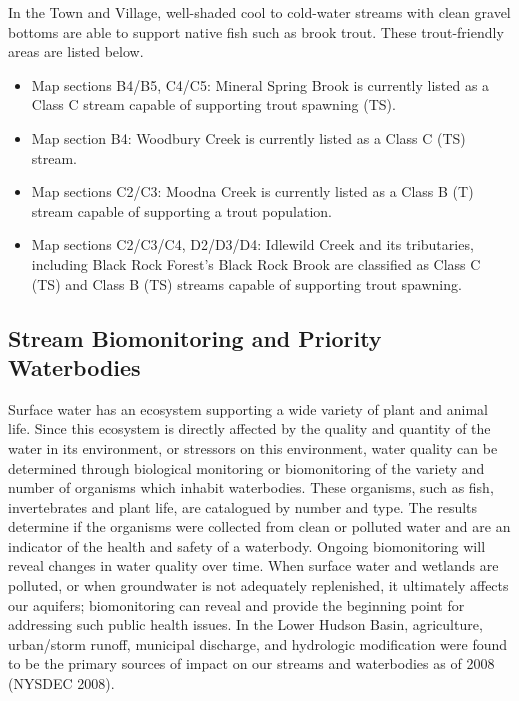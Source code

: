 In the Town and Village, well-shaded cool to cold-water streams with clean 
gravel bottoms are able to support native fish such as brook trout. These 
trout-friendly areas are listed below.
\begin{itemize}
    \item Map sections B4/B5, C4/C5: Mineral Spring Brook is currently listed 
as a Class C stream capable of supporting trout spawning (TS).
    \item Map section B4: Woodbury Creek is currently listed as a Class C (TS) 
stream.
    \item Map sections C2/C3: Moodna Creek is currently listed as a Class B (T) 
stream capable of supporting a trout population.
    \item Map sections C2/C3/C4, D2/D3/D4: Idlewild Creek and its tributaries, 
including Black Rock Forest’s Black Rock Brook are classified as Class C (TS) 
and Class B (TS) streams capable of supporting trout spawning.
\end{itemize}

\label{map:streamclassifications}

\subsection*{Stream Biomonitoring and Priority 
Waterbodies}\label{subsec:streambiomonitoring}
Surface water has an ecosystem supporting a wide variety of plant and animal 
life. Since this ecosystem is directly affected by the quality and quantity of 
the water in its environment, or stressors on this environment, water quality 
can be determined through biological monitoring or biomonitoring of the variety 
and number of organisms which inhabit waterbodies. These organisms, such as 
fish, invertebrates and plant life, are catalogued by number and type. The 
results determine if the organisms were collected from clean or polluted water 
and are an indicator of the health and safety of a waterbody. Ongoing 
biomonitoring will reveal changes in water quality over time. When surface 
water and wetlands are polluted, or when groundwater is not adequately 
replenished, it ultimately affects our aquifers; biomonitoring can reveal and 
provide the beginning point for addressing such public health issues. In the 
Lower Hudson Basin, agriculture, urban/storm runoff, municipal discharge, and 
hydrologic modification were found to be the primary sources of impact on our 
streams and waterbodies as of 2008 (NYSDEC 2008).

